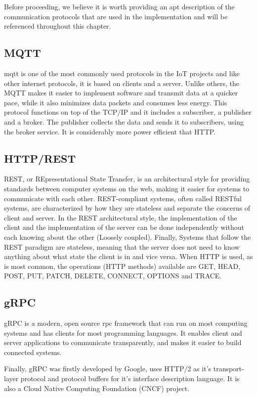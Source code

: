 Before proceeding, we believe it is worth providing an apt description of the communication protocols that are used in the implementation and will be referenced throughout this chapter.

\subsection{MQTT}
\acrfull{mqtt}\cite{mqtt} is one of the most commonly used protocols in the IoT projects and like other internet protocols, it is based on clients and a server. Unlike others, the MQTT makes it easier to implement software and transmit data at a quicker pace, while it also minimizes data packets and consumes less energy. This protocol functions on top of the TCP/IP and it includes a subscriber, a publisher and a broker. The publisher collects the data and sends it to subscribers, using the broker service. It is considerably more power efficient that HTTP.

\subsection{HTTP/REST}
REST, or REpresentational State Transfer, is an architectural style for providing standards between computer systems on the web, making it easier for systems to communicate with each other. REST-compliant systems, often called RESTful systems, are characterized by how they are stateless and separate the concerns of client and server. In the REST architectural style, the implementation of the client and the implementation of the server can be done independently without each knowing about the other (Loosely coupled). Finally, Systems that follow the REST paradigm are stateless, meaning that the server does not need to know anything about what state the client is in and vice versa. When HTTP is used, as is most common, the operations (HTTP methods) available are GET, HEAD, POST, PUT, PATCH, DELETE, CONNECT, OPTIONS and TRACE.

\subsection{gRPC}
gRPC\cite{grpc} is a modern, open source \acrfull{rpc} framework that can run on most computing systems and has clients for most programming languages. It enables client and server applications to communicate transparently, and makes it easier to build connected systems.

Finally, gRPC was firstly developed by Google, uses HTTP/2 as it’s transport-layer protocol and protocol buffers for it’s interface description language. It is also a Cloud Native Computing Foundation (CNCF) project.

